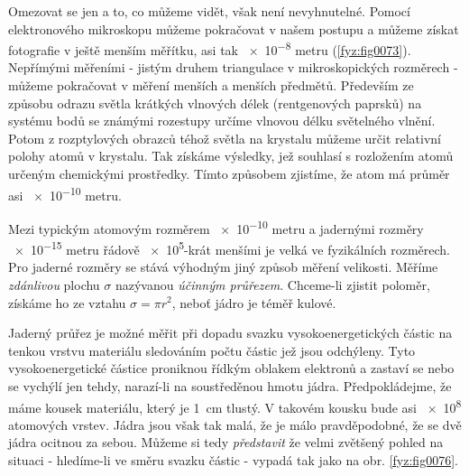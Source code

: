     Omezovat se jen a to, co můžeme vidět, však není  nevyhnutelné. Pomocí elektronového mikroskopu 
    můžeme pokračovat v našem postupu a můžeme získat fotografie v ještě menším měřítku, asi tak 
    \num{e-8} metru  (\ref{fyz:fig0073}). Nepřímými měřeními - jistým druhem triangulace v 
    mikroskopických rozměrech - můžeme pokračovat v měření menších a menších předmětů. Především ze 
    způsobu odrazu světla krátkých vlnových délek (rentgenových paprsků) na systému bodů se známými 
    rozestupy určíme vlnovou délku světelného vlnění. Potom z rozptylových obrazců téhož světla na 
    krystalu můžeme určit relativní polohy atomů v krystalu. Tak získáme výsledky, jež souhlasí s 
    rozložením atomů určeným chemickými prostředky. Tímto způsobem zjistíme, že atom má průměr asi 
    \num{e-10} metru. 

    Mezi typickým atomovým rozměrem \num{e-10} metru a jadernými rozměry \num{e-15} metru řádově 
    \num{e5}-krát menšími je velká  ve fyzikálních rozměrech. Pro jaderné rozměry se 
    stává výhodným jiný způsob měření velikosti. Měříme \emph{zdánlivou} plochu \(\sigma\) 
    nazývanou \emph{účinným průřezem}. Chceme-li zjistit poloměr, získáme ho ze vztahu \(\sigma = 
    \pi r^2\), neboť jádro je téměř kulové. 

    Jaderný průřez je možné měřit při dopadu svazku vysokoenergetických částic na tenkou vrstvu 
    materiálu sledováním počtu částic jež jsou odchýleny. Tyto vysokoenergetické částice  proniknou 
    řídkým oblakem elektronů a zastaví se nebo se vychýlí jen tehdy, narazí-li na soustředěnou 
    hmotu jádra. Předpokládejme, že máme kousek materiálu, který je \qty{1}{\cm} tlustý. V takovém 
    kousku bude asi \num{e8} atomových vrstev. Jádra jsou však tak malá, že je málo pravděpodobné, 
    že se dvě jádra ocitnou za sebou. Můžeme si tedy \emph{představit} že velmi zvětšený pohled na 
    situaci - hledíme-li ve směru svazku částic - vypadá tak jako na obr. \ref{fyz:fig0076}. 

